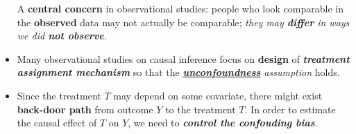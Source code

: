 \documentclass[11pt]{article}
\begin{document}
\begin{itemize}
A \textbf{central concern} in observational studies: people who look comparable in the \textbf{observed} data may not actually be comparable; \emph{they may \textbf{differ} in ways we did \textbf{not observe}}.

\item Many observational studies on causal inference focus on \textbf{design} of \emph{\textbf{treatment assignment mechanism}} so that the \emph{\underline{\textbf{unconfoundness}} assumption} holds. 

\item Since the treatment $T$ may depend on some covariate, there might exist \textbf{back-door path} from outcome $Y$ to the treatment $T$. In order to estimate the causal effect of $T$ on $Y$, we need to \textbf{\emph{control the confouding bias}}.  
\end{itemize}
\end{document}
